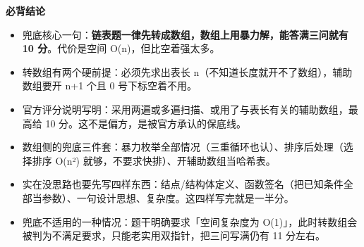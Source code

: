 \documentclass[10pt,a4paper]{ctexart}
\begin{document}



\textbf{必背结论}

\begin{itemize}

\item 兜底核心一句：\textbf{链表题一律先转成数组，数组上用暴力解，能答满三问就有 10 分}。代价是空间 O(n)，但比空着强太多。

\item 转数组有两个硬前提：必须先求出表长 n（不知道长度就开不了数组），辅助数组要开 n+1 个且 0 号下标空着不用。

\item 官方评分说明写明：采用两遍或多遍扫描、或用了与表长有关的辅助数组，最高给 10 分。这不是偏方，是被官方承认的保底线。

\item 数组侧的兜底三件套：暴力枚举全部情况（三重循环也认）、排序后处理（选择排序 O(n²) 就够，不要求快排）、开辅助数组当哈希表。

\item 实在没思路也要先写四样东西：结点/结构体定义、函数签名（把已知条件全部当参数）、一句设计思想、复杂度。这四样写完就是一半分。

\item 兜底不适用的一种情况：题干明确要求「空间复杂度为 O(1)」，此时转数组会被判为不满足要求，只能老实用双指针，把三问写满仍有 11 分左右。

\end{itemize}
\end{document}
